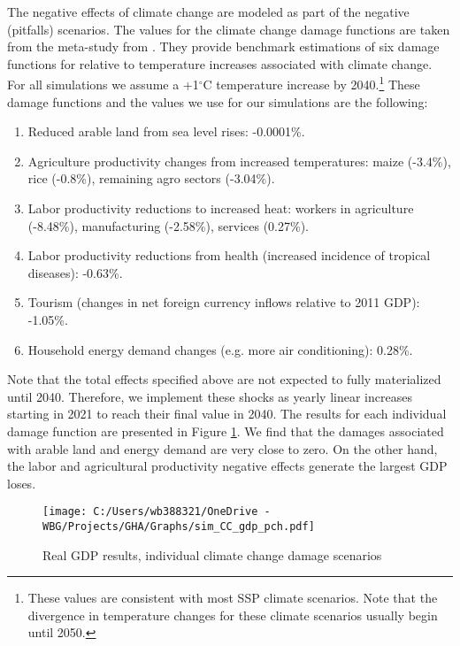 \documentclass[11pt,english]{article}
\begin{document}
The negative effects of climate change are modeled as part of the negative (pitfalls) scenarios. The values for the climate change damage functions are taken from the meta-study from \citet{Roson_Sartori_2016}. They provide benchmark estimations of six damage functions for relative to temperature increases associated with climate change. For all simulations we assume a +1$^{\circ}$C temperature increase by 2040.\footnote{These values are consistent with most SSP climate scenarios. Note that the divergence in temperature changes for these climate scenarios usually begin until 2050.} These damage functions and the values we use for our simulations are the following:
\begin{enumerate}
	\item Reduced arable land from sea level rises: -0.0001\%. 
	\item Agriculture productivity changes from increased temperatures: maize (-3.4\%), rice (-0.8\%), remaining agro sectors (-3.04\%).
	\item Labor productivity reductions to increased heat: workers in agriculture (-8.48\%), manufacturing (-2.58\%), services (0.27\%).
	\item Labor productivity reductions from health (increased incidence of tropical diseases):  -0.63\%.
	\item Tourism (changes in net foreign currency inflows relative to 2011 GDP): -1.05\%.
	\item Household energy demand changes (e.g. more air conditioning): 0.28\%.
\end{enumerate}

Note that the total effects specified above are not expected to fully materialized until 2040. Therefore, we implement these shocks as yearly linear increases starting in 2021 to reach their final value in 2040. The results for each individual damage function are presented in Figure \ref{fig_sim_CC_gdp_pch}. We find that the damages associated with arable land and energy demand are very close to zero. On the other hand, the labor and agricultural productivity negative effects generate the largest GDP loses.

\begin{figure}[ht!]\caption{Real GDP results, individual climate change damage scenarios}  \label{fig_sim_CC_gdp_pch}
	\centering
	\texttt{[image: C:/Users/wb388321/OneDrive - WBG/Projects/GHA/Graphs/sim\_CC\_gdp\_pch.pdf]}
\end{figure}
\end{document}
